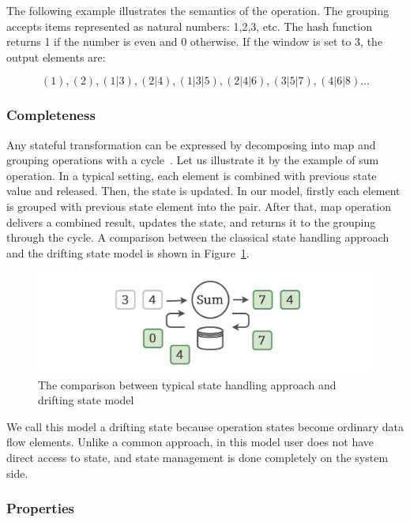 The following example illustrates the semantics of the operation. The grouping accepts items represented as natural numbers: 1,2,3, etc. The hash function returns 1 if the number is even and 0 otherwise. If the window is set to 3, the output elements are:

\[(1), (2), (1|3), (2|4), (1|3|5), (2|4|6), (3|5|7), (4|6|8)...\]

\subsubsection{Completeness}

Any stateful transformation can be expressed by decomposing into map and grouping operations with a cycle~\cite{we2018adbis}. Let us illustrate it by the example of sum operation. In a typical setting, each element is combined with previous state value and released. Then, the state is updated. In our model, firstly each element is grouped with previous state element into the pair. After that, map operation delivers a combined result, updates the state, and returns it to the grouping through the cycle. A comparison between the classical state handling approach and the drifting state model is shown in Figure~\ref{classical-drifting}.

\begin{figure}[htbp]
  \centering
  \includegraphics[width=.49\textwidth]{pics/classical-drifting}
  \caption{The comparison between typical state handling approach and drifting state model}
  \label {classical-drifting}
\end{figure}

We call this model a drifting state because operation states become ordinary data flow elements. Unlike a common approach, in this model user does not have direct access to state, and state management is done completely on the system side.

\subsubsection{Properties}

